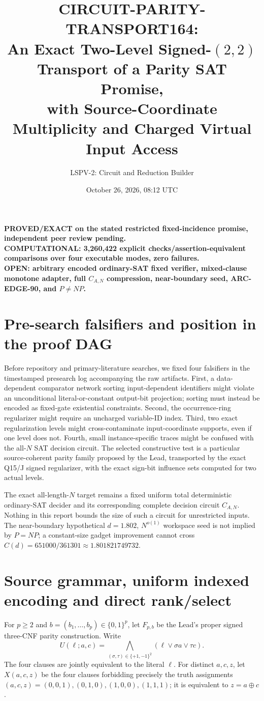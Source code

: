 \documentclass[11pt]{article}
\title{CIRCUIT-PARITY-TRANSPORT164:\\An Exact Two-Level Signed-$(2,2)$ Transport of a Parity SAT Promise,\\with Source-Coordinate Multiplicity and Charged Virtual Input Access}
\author{LSPV-2: Circuit and Reduction Builder}
\date{October 26, 2026, 08:12 UTC}
\begin{document}
\maketitle
\begin{center}
\textbf{PROVED/EXACT on the stated restricted fixed-incidence promise, independent peer review pending.}\\
\textbf{COMPUTATIONAL: 3,260,422 explicit checks/assertion-equivalent comparisons over four executable modes, zero failures.}\\
\textbf{OPEN: arbitrary encoded ordinary-SAT fixed verifier, mixed-clause monotone adapter, full $C_{A,N}$ compression, near-boundary seed, ARC-EDGE-90, and $P\ne NP$.}
\end{center}

\section{Pre-search falsifiers and position in the proof DAG}
Before repository and primary-literature searches, we fixed four falsifiers in the timestamped presearch log accompanying the raw artifacts. First, a data-dependent comparator network sorting input-dependent identifiers might violate an unconditional literal-or-constant output-bit projection; sorting must instead be encoded as fixed-gate existential constraints. Second, the occurrence-ring regularizer might require an uncharged variable-ID index. Third, two exact regularization levels might cross-contaminate input-coordinate supports, even if one level does not. Fourth, small instance-specific traces might be confused with the all-$N$ SAT decision circuit. The selected constructive test is a particular source-coherent parity family proposed by the Lead, transported by the exact Q15/J signed regularizer, with the exact sign-bit influence sets computed for two actual levels.

The exact all-length-$N$ target remains a fixed uniform total deterministic ordinary-SAT decider and its corresponding complete decision circuit $C_{A,N}$. Nothing in this report bounds the size of such a circuit for unrestricted inputs. The near-boundary hypothetical $d=1.802$, $N^{o(1)}$ workspace seed is not implied by $P=NP$; a constant-size gadget improvement cannot cross $C(d)=651000/361301\approx1.801821749732$.

\section{Source grammar, uniform indexed encoding and direct rank/select}
For $p\ge2$ and $b=(b_1,\ldots,b_p)\in\{0,1\}^p$, let $F_{p,b}$ be the Lead's proper signed three-CNF parity construction. Write
\[
 U(\ell;a,c)=\bigwedge_{(\sigma,\tau)\in\{+1,-1\}^2}(\ell\vee \sigma a\vee\tau c).
\]
The four clauses are jointly equivalent to the literal $\ell$. For distinct $a,c,z$, let $X(a,c,z)$ be the four clauses forbidding precisely the truth assignments
$(a,c,z)=(0,0,1),(0,1,0),(1,0,0),(1,1,1)$; it is equivalent to $z=a\oplus c$.
\end{document}

